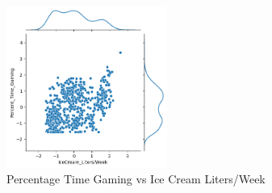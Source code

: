 \documentclass{article}
\begin{document}
\begin{figure}[H]
    \centering
    \includegraphics[width=0.47\textwidth]{pre_b.png}
    \caption{Percentage Time Gaming vs Ice Cream Liters/Week}
\end{figure}
\end{document}
